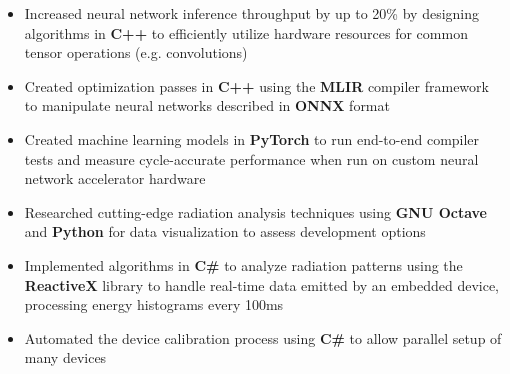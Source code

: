 \documentclass{moderncv}
\begin{document}
{\begin{itemize}
    \item Increased neural network inference throughput by up to 20\% by designing algorithms in \textbf{C++} to efficiently utilize hardware resources for common tensor operations (e.g. convolutions)
    \item Created optimization passes in \textbf{C++} using the \textbf{MLIR} compiler framework to manipulate neural networks described in \textbf{ONNX} format
    \item Created machine learning models in \textbf{PyTorch} to run end-to-end compiler tests and measure cycle-accurate performance when run on custom neural network accelerator hardware
\end{itemize}}

{\begin{itemize}
    \item Researched cutting-edge radiation analysis techniques using \textbf{GNU Octave} and \textbf{Python} for data visualization to assess development options
    \item Implemented algorithms in \textbf{C\#} to analyze radiation patterns using the \textbf{ReactiveX} library to handle real-time data emitted by an embedded device, processing energy histograms every 100ms
    \item Automated the device calibration process using \textbf{C\#} to allow parallel setup of many devices
\end{itemize}}

\begin{comment}
\cventry{Sep 2020 - Dec 2020}{Undergraduate Research Assistant}{University of Waterloo}{Waterloo ON}{}
{\begin{itemize}
    \item Implemented novel post-quantum cryptographic algorithms in \textbf{C}
    \item Designed and implemented cache-aware optimizations resulting in 60\% speed improvement
    \item Created custom boolean matrix library for use in cryptographic algorithms
\end{itemize}}
\end{comment}
\end{document}
